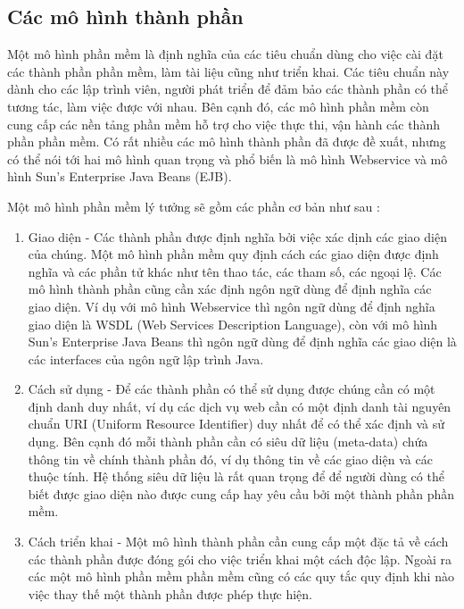\subsection{Các mô hình thành phần}
Một mô hình phần mềm là định nghĩa của các tiêu chuẩn dùng cho việc cài đặt các thành phần phần mềm, làm tài liệu cũng như triển khai. Các tiêu chuẩn này dành cho các lập trình viên, người phát triển để đảm bảo các thành phần có thể tương tác, làm việc được với nhau. Bên cạnh đó, các mô hình phần mềm còn cung cấp các nền tảng phần mềm hỗ trợ cho việc thực thi, vận hành các thành phần phần mềm. Có rất nhiều các mô hình thành phần đã được đề xuất, nhưng có thể nói tới hai mô hình quan trọng và phổ biến là mô hình Webservice và mô hình Sun’s  Enterprise  Java  Beans  (EJB).

Một mô hình phần mềm lý tưởng sẽ gồm các phần cơ bản như sau :

\begin{enumerate}
  \item Giao diện - Các thành phần được định nghĩa bởi việc xác dịnh các giao diện của chúng. Một mô hình phần mềm quy định cách các giao diện được định nghĩa và các phần tử khác như tên thao tác, các tham số, các ngoại lệ. Các mô hình thành phần cũng cần xác định ngôn ngữ dùng để định nghĩa các giao diện. Ví dụ với mô hình Webservice thì ngôn ngữ dùng để định nghĩa giao diện là WSDL (Web Services Description Language), còn với mô hình Sun’s  Enterprise  Java  Beans thì ngôn ngữ dùng để định nghĩa các giao diện là các interfaces của ngôn ngữ lập trình Java.
	\item Cách sử dụng - Để các thành phần có thể sử dụng được chúng cần có một định danh duy nhất, ví dụ các dịch vụ web cần có một định danh tài nguyên chuẩn URI (Uniform Resource Identifier) duy nhất để có thể xác định và sử dụng. Bên cạnh đó mỗi thành phần cần có siêu dữ liệu (meta-data) chứa thông tin về chính thành phần đó, ví dụ thông tin về các giao diện và các thuộc tính. Hệ thống siêu dữ liệu là rất quan trọng để để người dùng có thể biết được giao diện nào được cung cấp hay yêu cầu bởi một thành phần phần mềm.
	\item Cách triển khai - Một mô hình thành phần cần cung cấp một đặc tả về cách các thành phần được đóng gói cho việc triển khai một cách độc lập. Ngoài ra các một mô hình phần mềm phần mềm cũng có các quy tắc quy định khi nào việc thay thế một thành phần được phép thực hiện. 
	
\end{enumerate}


